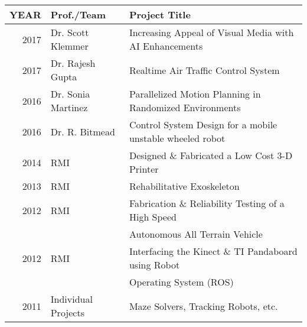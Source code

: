 \documentclass[]{deedy-resume-openfont}
\begin{document}
\begin{minipage}[t]{0.66\textwidth}
\begin{tabular}{rll}
YEAR	     & Prof./Team  & Project Title \\
\hline
2017	     & Dr. Scott Klemmer & Increasing Appeal of Visual Media with AI Enhancements\\
2017	     & Dr. Rajesh Gupta & Realtime Air Traffic Control System \\ 
2016         & Dr. Sonia Martinez & Parallelized Motion Planning in Randomized Environments\\
2016         &Dr. R. Bitmead & Control System Design for a mobile unstable wheeled robot\\
2014	     & RMI  & Designed \& Fabricated a Low Cost 3-D Printer\\
2013	     & RMI & Rehabilitative Exoskeleton\\
2012	     & RMI & Fabrication \& Reliability Testing of a High Speed \\& & Autonomous All Terrain Vehicle\\
2012	     & RMI & Interfacing the Kinect \& TI Pandaboard using Robot \\& & Operating System (ROS)\\
2011        &  Individual Projects & Maze Solvers, Tracking Robots, etc.\\
\end{tabular}
\sectionsep








\end{minipage} 
\end{document}
